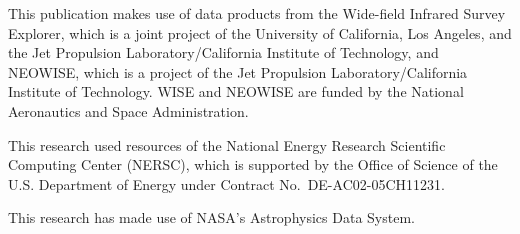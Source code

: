\documentclass[11pt,preprint]{aastex}
\begin{document}
This publication makes use of data products from the Wide-field
Infrared Survey Explorer, which is a joint project of the University
of California, Los Angeles, and the Jet Propulsion
Laboratory/California Institute of Technology, and NEOWISE, which is a
project of the Jet Propulsion Laboratory/California Institute of
Technology. WISE and NEOWISE are funded by the National Aeronautics
and Space Administration.

This research used resources of the National Energy Research
Scientific Computing Center (NERSC), which is supported by the Office
of Science of the U.S. Department of Energy under Contract
No.~DE-AC02-05CH11231.

This research has made use of NASA's Astrophysics Data System.

\end{document}
